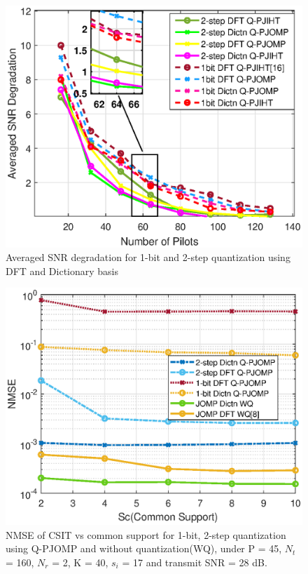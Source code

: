 \begin{center}
\begin{figure}
\centering
\includegraphics[scale=0.8]{figures/fig_ch_rec/fig2_final.eps}
\caption{Averaged SNR degradation for 1-bit and 2-step quantization using DFT and Dictionary basis  }
\label{Fsnr-deg}
\end{figure}

\begin{figure}[h!]
\centering
\includegraphics[scale=0.8]{figures/fig_ch_rec/common_support.eps}
\caption{NMSE of CSIT vs common support for 1-bit, 2-step quantization using Q-PJOMP and without quantization(WQ), under P = 45,
$N_t$ = 160, $N_r$ = 2, K = 40, $s_i$ = 17 and transmit SNR = 28 dB.}
\label{sc-jomp}
\end{figure}


\end{center}
